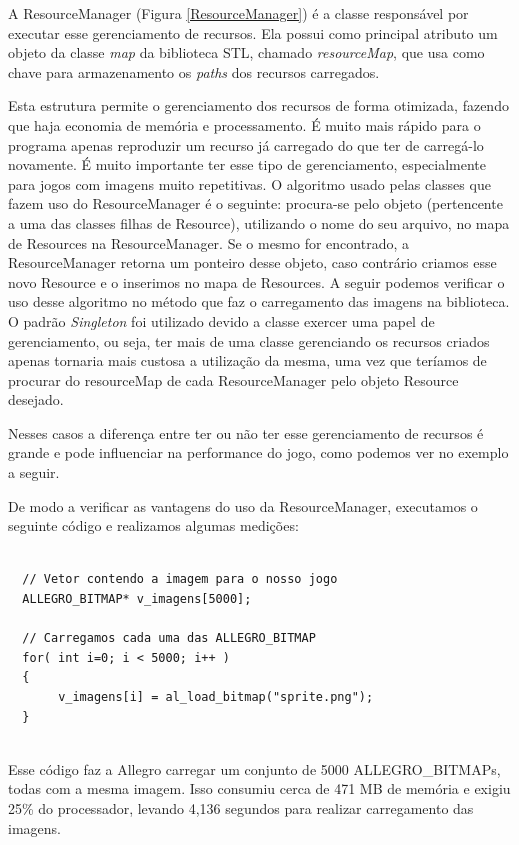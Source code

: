 %
%
\par 
A ResourceManager (Figura \ref{ResourceManager}) é a classe responsável por executar esse gerenciamento de recursos. Ela possui como principal atributo um objeto da classe \textit{map} da biblioteca STL, chamado \textit{resourceMap}, que usa como chave para armazenamento os \textit{paths} dos recursos carregados.
\par
Esta estrutura permite o gerenciamento dos recursos de forma otimizada, fazendo que haja economia de memória e processamento. É muito mais rápido para o programa apenas reproduzir um recurso já carregado do que ter de carregá-lo novamente. É muito importante ter esse tipo de gerenciamento, especialmente para jogos com imagens muito repetitivas. O algoritmo usado pelas classes que fazem uso do ResourceManager é o seguinte: procura-se pelo objeto (pertencente a uma das classes filhas de Resource), utilizando o nome do seu arquivo, no mapa de Resources na ResourceManager. Se o mesmo for encontrado, a ResourceManager retorna um ponteiro desse objeto, caso contrário criamos esse novo Resource e o inserimos no mapa de Resources. A seguir podemos verificar o uso desse algoritmo no método que faz o carregamento das imagens na biblioteca. O padrão \textit{Singleton} foi utilizado devido a classe exercer uma papel de gerenciamento, ou seja, ter mais de uma classe gerenciando os recursos criados apenas tornaria mais custosa a utilização da mesma, uma vez que teríamos de procurar do resourceMap de cada ResourceManager pelo objeto Resource desejado.
%

%
\par 
Nesses casos a diferença entre ter ou não ter esse gerenciamento de recursos é grande e pode influenciar na performance do jogo, como podemos ver no exemplo a seguir.
\par 
De modo a verificar as vantagens do uso da ResourceManager, executamos o seguinte código e realizamos algumas medições: 
%
%
\begin{lstlisting}

  // Vetor contendo a imagem para o nosso jogo
  ALLEGRO_BITMAP* v_imagens[5000];
      
  // Carregamos cada uma das ALLEGRO_BITMAP
  for( int i=0; i < 5000; i++ )
  {
       v_imagens[i] = al_load_bitmap("sprite.png");
  }
  
\end{lstlisting}
%
\par
Esse código faz a Allegro carregar um conjunto de 5000 ALLEGRO\_BITMAPs, todas com a mesma imagem. Isso consumiu cerca de 471 MB de memória e exigiu 25\% do processador, levando 4,136 segundos para realizar carregamento das imagens. 
